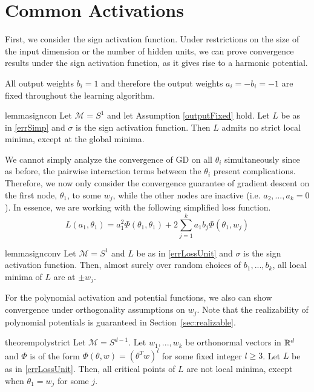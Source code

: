 \section{Common Activations}
First, we consider the sign activation function. Under restrictions on the size of the input dimension or the number of hidden units, we can prove convergence results under the sign activation function, as it gives rise to a harmonic potential.

\begin{assumption}
\label{outputFixed}
All output weights $b_i = 1$ and therefore the output weights  $a_i = - b_i = -1$ are fixed throughout the learning algorithm. 
\end{assumption}

\begin{restatable}{lemma}{signcon}\label{signCon}
Let $\mathcal{M} = S^1$ and let Assumption \ref{outputFixed} hold. Let $L$ be as in \eqref{errSimp} and $\sigma$ is the sign activation function. Then $L$ admits no strict local minima, except at the global minima.
\end{restatable}


We cannot simply analyze the convergence of GD
on all $\theta_i$ simultaneously since as before, the pairwise
interaction terms between the $\theta_i$ present complications. Therefore, we now only consider the convergence guarantee of gradient descent on the first node, $\theta_1$, to some $w_j$, while the other nodes are inactive (i.e. $a_2,...,a_k = 0$). In essence, we are working with the following simplified loss function.
%
\begin{equation}\label{errLossUnit}
L(a_1,\theta_1) =  a_1^2 \Phi(\theta_1,\theta_1)  + 2\sum_{j=1}^k a_1b_j \Phi(\theta_1,w_j)
\end{equation}


\begin{restatable}{lemma}{signconv}
\label{SignConv}
Let $\mathcal{M} = S^1$ and $L$ be as in \eqref{errLossUnit} and $\sigma$ is the sign activation function. Then, almost surely over random choices of $b_1,...,b_k$, all local minima of $L$ are at $\pm w_j$. 
\end{restatable}
%
For the polynomial activation and potential functions, we also can show convergence under orthogonality assumptions on $w_j$. Note that the realizability of polynomial potentials is guaranteed in Section~\ref{sec:realizable}.

\begin{restatable}{theorem}{polystrict}
\label{PolyStrict}
Let $\mathcal{M} = S^{d-1}$. Let $w_1,...,w_k$ be orthonormal vectors in ${\mathbb{R}}^d$ and $\Phi$ is of the form $\Phi(\theta,w) = (\theta^Tw)^l$ for some fixed integer $l \geq 3$. Let $L$ be as in \eqref{errLossUnit}. Then, all critical points of $L$ are not local minima, except when $\theta_1 = w_j$ for some $j$.   
\end{restatable}


